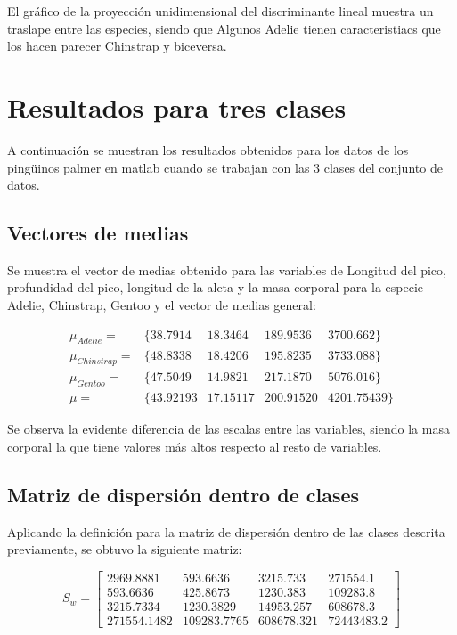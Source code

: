 \documentclass[11pt, letterpaper]{article}
\begin{document}
El gráfico de la proyección unidimensional del discriminante lineal muestra un traslape entre las especies, siendo que Algunos Adelie tienen caracteristiacs que los hacen parecer Chinstrap y biceversa. 

\newpage

\section{Resultados para tres clases}

A continuación se muestran los resultados obtenidos para los datos de los pingüinos palmer en matlab cuando se trabajan con las 3 clases del conjunto de datos. 

\subsection{Vectores de medias}

Se muestra el vector de medias obtenido para las variables de Longitud del pico, profundidad del pico, longitud de la aleta y la masa corporal para la especie Adelie, Chinstrap, Gentoo y el vector de medias general:

$$
\begin{matrix}
	\mu_{Adelie} =  &\{38.7914 & 18.3464 & 189.9536 & 3700.662\}	 \\
	\mu_{Chinstrap} = & \{48.8338 & 18.4206 & 195.8235 & 3733.088\}	 \\
	\mu_{Gentoo} = & \{47.5049 & 14.9821 &  217.1870  & 5076.016\}	 \\
	\mu = & \{43.92193 & 17.15117 & 200.91520 & 4201.75439\}	 
\end{matrix}
$$
 



Se observa la evidente diferencia de las escalas entre las variables, siendo la masa corporal la que tiene valores más altos respecto al resto de variables.

\subsection{Matriz de dispersión dentro de clases}

Aplicando la definición para la matriz de dispersión dentro de las clases descrita previamente, se obtuvo la siguiente matriz:

$$
S_w = 
\begin{bmatrix}
2969.8881 & 593.6636 & 3215.733 & 271554.1 \\
593.6636 & 425.8673 & 1230.383 & 109283.8 \\
3215.7334 & 1230.3829 & 14953.257 & 608678.3 \\
271554.1482 & 109283.7765 & 608678.321 & 72443483.2
\end{bmatrix}
$$
\end{document}
